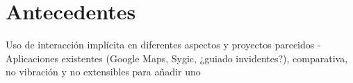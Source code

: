 \chapter{Antecedentes}
\label{chap:antecedentes}

 Uso de interacción implícita en diferentes aspectos y proyectos parecidos
 - Aplicaciones existentes (Google Maps, Sygic, ¿guiado invidentes?), comparativa, no vibración y no extensibles para añadir uno

